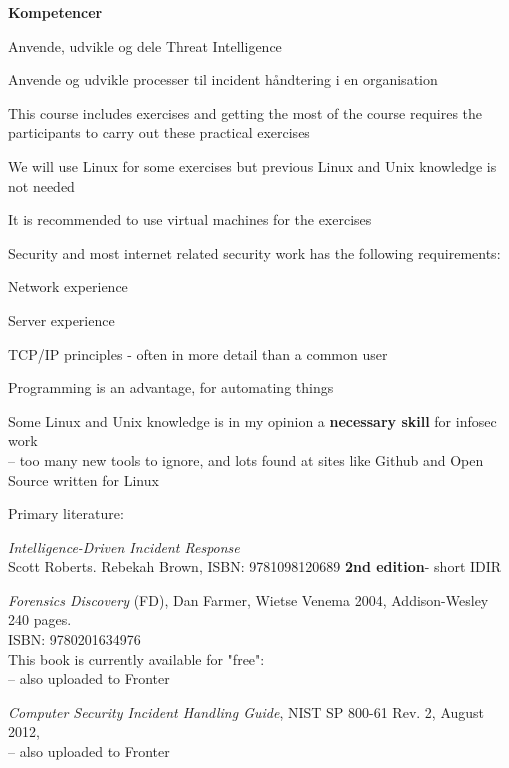 \documentclass[Screen16to9,17pt]{foils}
\begin{document}
{\bf Kompetencer}
\begin{list2}
\item Anvende, udvikle og dele Threat Intelligence
\item Anvende og udvikle processer til incident håndtering i en organisation
\end{list2}


\begin{list1}
\item This course includes exercises and getting the most of the course requires the participants to carry out these practical exercises
\item We will use Linux for some exercises but previous Linux and Unix knowledge is not needed
\item It is recommended to use virtual machines for the exercises
\item Security and most internet related security work has the following requirements:
\begin{list2}
\item Network experience
\item Server experience
\item TCP/IP principles - often in more detail than a common user
\item Programming is an advantage, for automating things
\item Some Linux and Unix knowledge is in my opinion a {\bf necessary skill} for infosec work\\
-- too many new tools to ignore, and lots found at sites like Github and Open Source written for Linux
\end{list2}
\end{list1}



Primary literature:
\begin{list2}
\item \emph{Intelligence-Driven Incident Response} \\
 Scott Roberts. Rebekah Brown, ISBN: 9781098120689 {\bf 2nd edition}- short IDIR

\item \emph{Forensics Discovery} (FD), Dan Farmer, Wietse Venema 2004, Addison-Wesley 240 pages.\\
ISBN: 9780201634976\\
This book is currently available for "free":\\
 -- also uploaded to Fronter

\item \emph{
Computer Security Incident Handling Guide}, NIST SP 800-61 Rev. 2, August 2012,\\
 -- also uploaded to Fronter
\end{list2}
\end{document}
